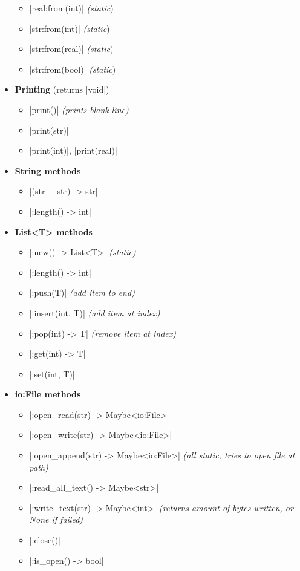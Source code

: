 \documentclass[11pt]{report}
\begin{document}
\begin{multicols}{2}
\begin{itemize}[topsep=0pt,leftmargin=*]
\begin{itemize}[nosep,topsep=0pt,leftmargin=*]
    \item |real:from(int)| \emph{(static})
    \item |str:from(int)| \emph{(static})
    \item |str:from(real)| \emph{(static})
    \item |str:from(bool)| \emph{(static})
    \end{itemize}
    \item \textbf{Printing} (returns |void|)
    \begin{itemize}[nosep,topsep=0pt,leftmargin=*]
    \item |print()| \emph{(prints blank line)}
    \item |print(str)|
    \item |print(int)|, |print(real)|
    \end{itemize}
    \item \textbf{String methods}
    \begin{itemize}[nosep,topsep=0pt,leftmargin=*]
    \item |(str + str) -> str|
    \item |:length() -> int|
    \end{itemize}
    \item \textbf{List<T> methods}
    \begin{itemize}[nosep,topsep=0pt,leftmargin=*]
    \item |:new() -> List<T>| \emph{(static)}
    \item |:length() -> int|
    \item |:push(T)| \emph{(add item to end)}
    \item |:insert(int, T)| \emph{(add item at index)}
    \item |:pop(int) -> T| \emph{(remove item at index)}
    \item |:get(int) -> T|
    \item |:set(int, T)|
    \end{itemize}
    \item \textbf{io:File methods}
    \begin{itemize}[nosep,topsep=0pt,leftmargin=*]
    \item |:open_read(str) -> Maybe<io:File>|
    \item |:open_write(str) -> Maybe<io:File>|
    \item |:open_append(str) -> Maybe<io:File>| \emph{(all static, tries to open file at path)}
    \item |:read_all_text() -> Maybe<str>|
    \item |:write_text(str) -> Maybe<int>| \emph{(returns amount of bytes written, or None if failed)}
    \item |:close()|
    \item |:is_open() -> bool|
    \end{itemize}
\end{itemize}
\end{multicols}
\end{document}
